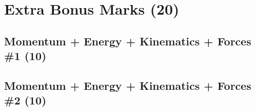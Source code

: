 \documentclass{article}
\begin{document}
\section{Extra Bonus Marks (20)}
\subsection{Momentum + Energy + Kinematics + Forces \#1 (10)}
\subsection{Momentum + Energy + Kinematics + Forces \#2 (10)}
\end{document}
